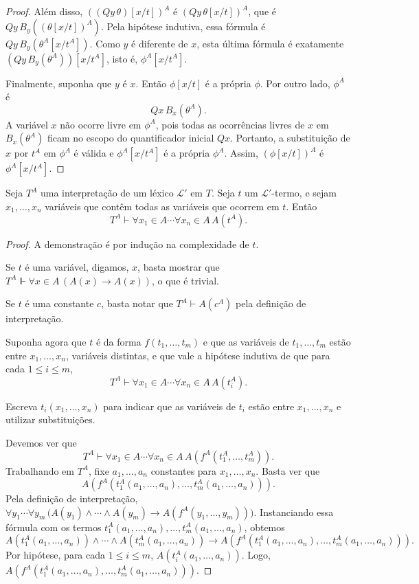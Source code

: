 \begin{proof}
    Além disso, $((Qy\,\theta)[x/t])^A$ é $(Qy\,\theta[x/t])^A$, que é $Qy\,B_y((\theta[x/t])^A)$.
    Pela hipótese indutiva, essa fórmula é $Qy\,B_y(\theta^A[x/t^A])$.
    Como $y$ é diferente de $x$, esta última fórmula é exatamente $(Qy\,B_y(\theta^A))[x/t^A]$,
    isto é, $\phi^A[x/t^A]$.

    Finalmente, suponha que $y$ é $x$.
    Então $\phi[x/t]$ é a própria $\phi$.
    Por outro lado, $\phi^A$ é
    \[
        Qx\,B_x(\theta^A).
    \]
    A variável $x$ não ocorre livre em $\phi^A$, pois todas as ocorrências livres de $x$ em $B_x(\theta^A)$ ficam no escopo do quantificador inicial $Qx$.
    Portanto, a substituição de $x$ por $t^A$ em $\phi^A$ é válida e $\phi^A[x/t^A]$ é a própria $\phi^A$.
    Assim, $(\phi[x/t])^A$ é $\phi^A[x/t^A]$.
\end{proof}

\begin{metalemma}\label{mlem:termosInterpretadosPertencemAA}
    Seja $T^A$ uma interpretação de um léxico $\mathcal L'$ em $T$.
    Seja $t$ um $\mathcal L'$-termo, e sejam $x_1,\dots,x_n$ variáveis que contêm todas as variáveis que ocorrem em $t$.
    Então
    \[
        T^A\vdash \forall x_1\in A\cdots\forall x_n\in A\,A(t^A).
    \]
\end{metalemma}
\begin{proof}
    A demonstração é por indução na complexidade de $t$.

    Se $t$ é uma variável, digamos, $x$, basta mostrar que $T^A\Vdash \forall x\in A\,(A(x)\rightarrow A(x))$, o que é trivial.

    Se $t$ é uma constante $c$, basta notar que $T^A\vdash A(c^A)$ pela definição de interpretação.

    Suponha agora que $t$ é da forma $f(t_1,\dots,t_m)$ e que as variáveis de $t_1,\dots,t_m$ estão entre $x_1,\dots,x_n$, variáveis distintas, e que vale a hipótese indutiva de que para cada $1\leq i\leq m$,
    \[
        T^A\vdash \forall x_1\in A\cdots\forall x_n\in A\,A(t_i^A).
    \]

    Escreva $t_i(x_1,\dots,x_n)$ para indicar que as variáveis de $t_i$ estão entre $x_1,\dots,x_n$ e utilizar substituições.

    Devemos ver que
    \[
        T^A\vdash \forall x_1\in A\cdots\forall x_n\in A\,A(f^A(t_1^A,\dots,t_m^A)).
    \]
    Trabalhando em $T^A$, fixe $a_1, \dots, a_n$ constantes para $x_1, \dots, x_n$.
    Basta ver que
    \[A(f^A(t_1^A(a_1,\dots,a_n),\dots,t_m^A(a_1,\dots,a_n))).
    \]
    Pela definição de interpretação, $\forall y_1\cdots\forall y_m\,
        \bigl(A(y_1)\wedge\cdots\wedge A(y_m)\to
        A(f^A(y_1,\dots,y_m))\bigr)$.
    Instanciando essa fórmula com os termos $t_1^A(a_1,\dots,a_n),\dots,t_m^A(a_1,\dots,a_n)$, obtemos
    \[
        A(t_1^A(a_1,\dots,a_n))\wedge\cdots\wedge A(t_m^A(a_1,\dots,a_n))\to
        A(f^A(t_1^A(a_1,\dots,a_n),\dots,t_m^A(a_1,\dots,a_n))).
    \]
    Por hipótese, para cada $1\leq i\leq m$, $A(t_i^A(a_1,\dots,a_n))$.
    Logo, $A(f^A(t_1^A(a_1,\dots,a_n),\dots,t_m^A(a_1,\dots,a_n)))$.
\end{proof}

